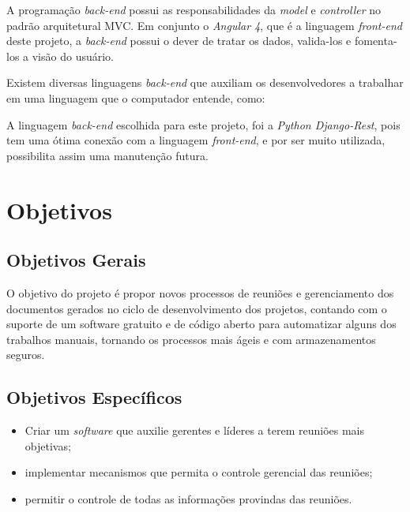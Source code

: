 A programação \textit{back-end} possui as responsabilidades da \textit{model} e \textit{controller} no padrão arquitetural MVC. Em conjunto o \textit{Angular 4}, que é a linguagem \textit{front-end} deste projeto, a \textit{back-end} possui o dever de tratar os dados, valida-los e fomenta-los
a visão do usuário.

Existem diversas linguagens \textit{back-end} que auxiliam os desenvolvedores a trabalhar em uma linguagem que o computador entende, como:


A linguagem \textit{back-end} escolhida para este projeto, foi a \textit{Python Django-Rest}, pois tem uma ótima conexão com a linguagem \textit{front-end}, e por ser muito utilizada, possibilita assim uma manutenção futura.

\section{Objetivos}

\subsection{Objetivos Gerais}

O objetivo do projeto é propor novos processos de reuniões e gerenciamento dos documentos gerados no ciclo de desenvolvimento dos projetos, contando com o suporte de um software gratuito e de código aberto para automatizar alguns dos trabalhos manuais, tornando os processos mais ágeis e com armazenamentos seguros.

\subsection{Objetivos Específicos}

\begin{itemize}
    \item Criar um \textit{software} que auxilie gerentes e líderes a terem reuniões mais objetivas;
    \item implementar mecanismos que permita o controle gerencial das reuniões;
    \item permitir o controle de todas as informações provindas das reuniões.
\end{itemize}
